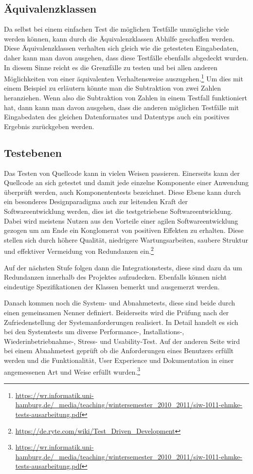 \subsection{Äquivalenzklassen}
Da selbst bei einem einfachen Test die möglichen Testfälle unmögliche viele werden können, kann durch die Äquivalenzklassen Abhilfe geschaffen werden. 
Diese Äquivalenzklassen verhalten sich gleich wie die getesteten Eingabedaten, daher kann man davon ausgehen, dass diese Testfälle ebenfalls abgedeckt wurden. 
In diesem Sinne reicht es die Grenzfälle zu testen und bei allen anderen Möglichkeiten von einer äquivalenten Verhaltensweise auszugehen.\footnote{\url{https://wr.informatik.uni-hamburg.de/_media/teaching/wintersemester_2010_2011/siw-1011-ehmke-tests-ausarbeitung.pdf}}  
Um dies mit einem Beispiel zu erläutern könnte man die Subtraktion von zwei Zahlen heranziehen. 
Wenn also die Subtraktion von Zahlen in einem Testfall funktioniert hat, dann kann man davon ausgehen, dass die anderen möglichen Testfälle mit Eingabedaten des gleichen Datenformates und Datentyps auch ein positives Ergebnis zurückgeben werden.

\subsection{Testebenen}
Das Testen von Quellcode kann in vielen Weisen passieren. Einerseits kann der Quellcode an sich getestet und damit jede einzelne Komponente einer Anwendung überprüft werden, auch Komponententests bezeichnet.
Diese Ebene kann durch ein besonderes Designparadigma auch zur leitenden Kraft der Softwareentwicklung werden, dies ist die testgetriebene Softwareentwicklung.
Dabei wird meistens Nutzen aus den Vorteile einer agilen Softwareentwicklung gezogen um am Ende ein Konglomerat von positiven Effekten zu erhalten.
Diese stellen sich durch höhere Qualität, niedrigere Wartungsarbeiten, saubere Struktur und effektiver Vermeidung von Redundanzen ein.\footnote{\url{https://de.ryte.com/wiki/Test_Driven_Development}}

Auf der nächsten Stufe folgen dann die Integrationstests, diese sind dazu da um Redundanzen innerhalb des Projektes aufzudecken. Ebenfalls können nicht eindeutige Spezifikationen der Klassen bemerkt und ausgemerzt werden.

Danach kommen noch die System- und Abnahmetests, diese sind beide durch einen gemeinsamen Nenner definiert. Beiderseits wird die Prüfung nach der Zufriedenstellung der Systemanforderungen realisiert.
In Detail handelt es sich bei den Systemtests um diverse Performance-, Installations-, Wiederinbetriebnahme-, Stress- und Usability-Test.
Auf der anderen Seite wird bei einem Abnahmetest geprüft ob die Anforderungen eines Benutzers erfüllt werden und die Funktionalität, User Experience und Dokumentation in einer angemessenen Art und Weise erfüllt wurden.\footnote{\url{https://wr.informatik.uni-hamburg.de/_media/teaching/wintersemester_2010_2011/siw-1011-ehmke-tests-ausarbeitung.pdf}} 

